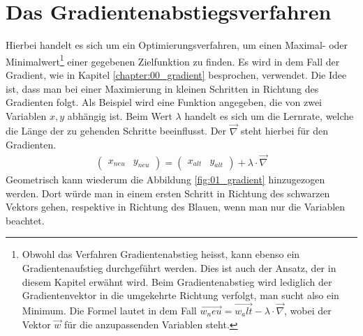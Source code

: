 \section{Das Gradientenabstiegsverfahren}\label{chapter:01_gradientenabstiegsverfahren}
Hierbei handelt es sich um ein Optimierungsverfahren, um einen Maximal- oder Minimalwert\footnote{Obwohl das Verfahren Gradientenabstieg
heisst, kann ebenso ein Gradientenaufstieg durchgeführt werden. Dies ist auch der Ansatz, der in diesem Kapitel erwähnt wird.
Beim Gradientenabstieg wird lediglich der Gradientenvektor in die umgekehrte Richtung verfolgt, man sucht also ein Minimum.
Die Formel lautet in dem Fall $\vec{w_neu} = \vec{w_alt} - \lambda \cdot \vec{\nabla}$, wobei der Vektor $\vec{w}$ für
die anzupassenden Variablen steht.} einer gegebenen Zielfunktion
zu finden. Es wird in dem Fall der Gradient, wie in Kapitel \ref{chapter:00_gradient} besprochen, verwendet. Die Idee
ist, dass man bei einer Maximierung in kleinen Schritten in Richtung des Gradienten folgt. Als Beispiel wird eine
Funktion angegeben, die von zwei Variablen $x, y$ abhängig ist. Beim Wert $\lambda$ handelt es sich um die Lernrate, welche
die Länge der zu gehenden Schritte beeinflusst. Der $\vec{\nabla}$ steht hierbei für den Gradienten.
\begin{align}
    \begin{pmatrix}x_{neu} & y_{neu}\end{pmatrix} = \begin{pmatrix}x_{alt} & y_{alt}\end{pmatrix} + \lambda \cdot \vec{\nabla}
\end{align}
Geometrisch kann wiederum die Abbildung \ref{fig:01_gradient} hinzugezogen werden. Dort würde man in einem ersten Schritt
in Richtung des schwarzen Vektors gehen, respektive in Richtung des Blauen, wenn man nur die Variablen beachtet.